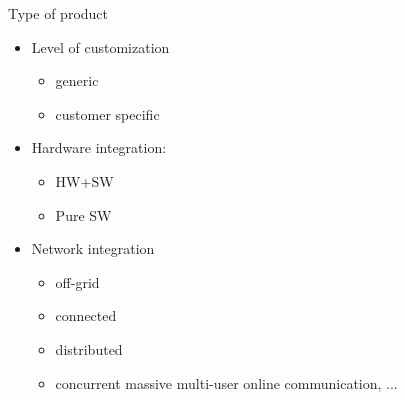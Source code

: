 \begin{Slide}{Type of product}
\begin{itemize}
\item Level of customization
\begin{itemize}
\item generic
\item customer specific
\end{itemize}
\item Hardware integration:
\begin{itemize}
\item HW+SW 
\item Pure SW
\end{itemize}
\item Network integration
\begin{itemize}
\item off-grid
\item connected
\item distributed
\item concurrent massive multi-user online communication, ...

\end{itemize}
\end{itemize}
\end{Slide}